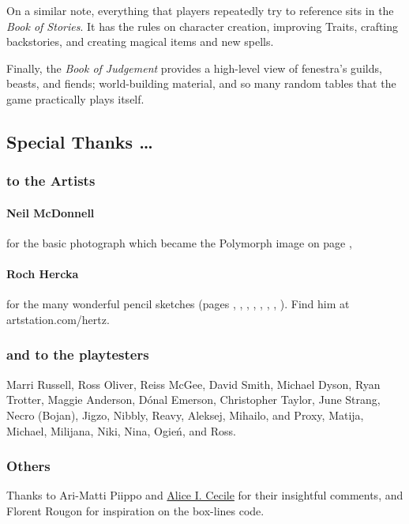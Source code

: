\begin{multicols}{2}
On a similar note, everything that players repeatedly try to reference sits in the \textit{Book of Stories}.
It has the rules on character creation, improving Traits, crafting backstories, and creating magical items and new spells.

Finally, the \textit{Book of Judgement} provides a high-level view of \gls{fenestra}'s guilds, beasts, and fiends; world-building material, and so many random tables that the game practically plays itself.

\subsection*{Special Thanks \ldots}

\subsubsection*{to the Artists}

\paragraph{Neil McDonnell} for the basic photograph which became the Polymorph image on page \pageref{Roch_Hercka/polymorph},

\paragraph{Roch Hercka} for the many wonderful pencil sketches (pages 
\pageref{Roch_Hercka/dwarf_encumbrance}, 
\pageref{Roch_Hercka/cave_fight}, 
\pageref{Roch_Hercka/stances}, 
\pageref{Roch_Hercka/vitals_shot}, 
\pageref{Roch_Hercka/conjuration_right}, 
\pageref{Roch_Hercka/polymorph}, 
\pageref{Roch_Hercka/dwarvish_runes}, 
\pageref{Roch_Hercka/flashing_light}).
Find him at artstation.com/hertz.

\subsubsection*{and to the playtesters} Marri Russell, Ross Oliver, Reiss McGee, David Smith, Michael Dyson, Ryan Trotter, Maggie Anderson, 
D\'{o}nal Emerson, Christopher Taylor, June Strang, 
Necro (Bojan), Jigzo, Nibbly, Reavy, 
Aleksej, Mihailo, and Proxy,
Matija, Michael, Milijana, Niki, Nina, Ogie\'n,
and Ross.

\subsubsection*{Others}
Thanks to Ari-Matti Piippo and \href{https://www.twitter.com/AliceICecile}{Alice I. Cecile} for their insightful comments,
and Florent Rougon for inspiration on the box-lines code.


\end{multicols}

